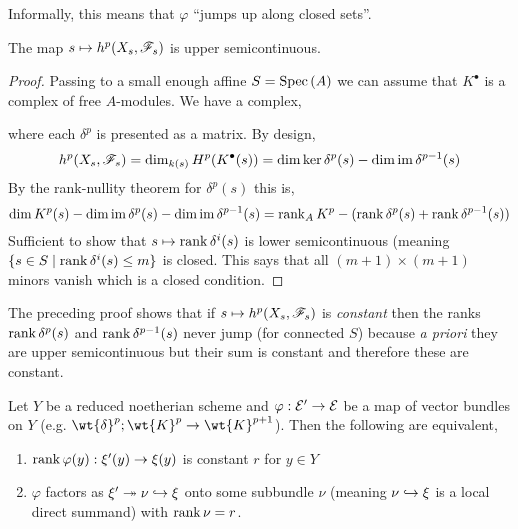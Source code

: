 \documentclass[12pt]{article}
\begin{document}
\begin{remark}
Informally, this means that $\varphi$ ``jumps up along closed sets''. 
\end{remark}

\begin{corollary}[Semicontinuity]
The map $s \mapsto h^p(X_s, \mathscr{F}_s)$ is upper semicontinuous. 
\end{corollary}

\begin{proof}
Passing to a small enough affine $S = \mathrm{Spec}\left( A \right)$ we can assume that $K^\bullet$ is a complex of free $A$-modules. We have a complex,
\begin{center}
\end{center}
where each $\delta^p$ is presented as a matrix. By design,
\[ h^p(X_s, \mathscr{F}_s) = \dim_{k(s)} H^p(K^\bullet(s)) = \dim{\ker{\delta^p(s)}} - \dim{\operatorname{\mathrm{im}}{\delta^{p-1}(s)}} \]
By the rank-nullity theorem for $\delta^p(s)$ this is,
\[ \dim{K^p(s)} - \dim{\operatorname{\mathrm{im}}{\delta^p(s)}} - \dim{\operatorname{\mathrm{im}}{\delta^{p-1}(s)}} = \operatorname{\mathrm{rank}}_A{K^p} - (\operatorname{\mathrm{rank}}{\delta^p(s)} + \operatorname{\mathrm{rank}}{\delta^{p-1}(s)}) \]
Sufficient to show that $s \mapsto \operatorname{\mathrm{rank}}{\delta^i(s)}$ is lower semicontinuous (meaning $\{s \in S \mid \operatorname{\mathrm{rank}}{\delta^i(s)} \le m \}$ is closed. This says that all $(m+1) \times (m+1)$ minors vanish which is a closed condition. 
\end{proof}

\begin{remark}
The preceding proof shows that if $s \mapsto h^p(X_s, \mathscr{F}_s)$ is \textit{constant} then the ranks $\operatorname{\mathrm{rank}}{\delta^p(s)}$ and $\operatorname{\mathrm{rank}}{\delta^{p-1}(s)}$ never jump (for connected $S$) because \textit{a priori} they are upper semicontinuous but their sum is constant and therefore these are constant. 
\end{remark}

\begin{lemma}
Let $Y$ be a reduced noetherian scheme and $\varphi : \mathcal{E}' \to \mathcal{E}$ be a map of vector bundles on $Y$ (e.g. $\wt{\delta}^p ; \wt{K}^p \to \wt{K}^{p+1}$). Then the following are equivalent,
\begin{enumerate}
\item $\operatorname{\mathrm{rank}}{\varphi(y)} : \xi'(y) \to \xi(y)$ is constant $r$ for $y \in Y$
\item $\varphi$ factors as $\xi' \twoheadrightarrow \nu \hookrightarrow \xi$ onto some subbundle $\nu$ (meaning $\nu \hookrightarrow \xi$ is a local direct summand) with $\operatorname{\mathrm{rank}}{\nu} = r$.  
\end{enumerate}
\end{lemma}
\end{document}
